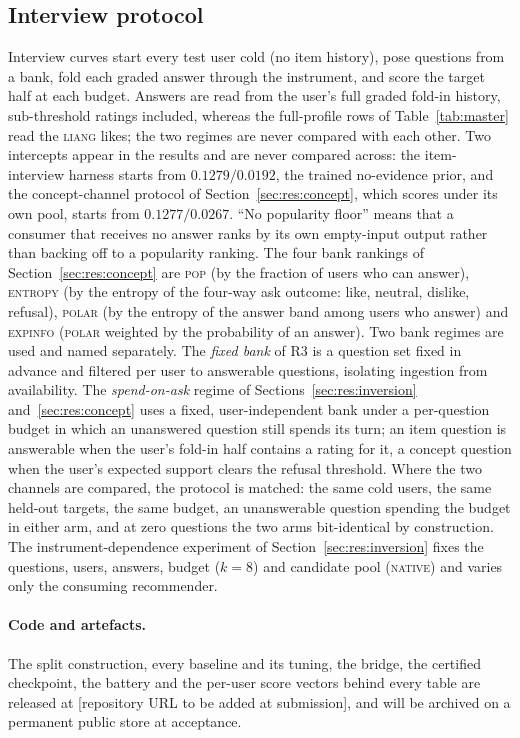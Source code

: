 \documentclass[manuscript,screen,review]{acmart}
\begin{document}
\subsection{Interview protocol}
Interview curves start every test user cold (no item history), pose questions from a bank, fold each graded answer through the instrument, and score the target half at each budget. Answers are read from the user's full graded fold-in history, sub-threshold ratings included, whereas the full-profile rows of Table~\ref{tab:master} read the \textsc{liang} likes; the two regimes are never compared with each other. Two intercepts appear in the results and are never compared across: the item-interview harness starts from $0.1279/0.0192$, the trained no-evidence prior, and the concept-channel protocol of Section~\ref{sec:res:concept}, which scores under its own pool, starts from $0.1277/0.0267$. ``No popularity floor'' means that a consumer that receives no answer ranks by its own empty-input output rather than backing off to a popularity ranking. The four bank rankings of Section~\ref{sec:res:concept} are \textsc{pop} (by the fraction of users who can answer), \textsc{entropy} (by the entropy of the four-way ask outcome: like, neutral, dislike, refusal), \textsc{polar} (by the entropy of the answer band among users who answer) and \textsc{expinfo} (\textsc{polar} weighted by the probability of an answer). Two bank regimes are used and named separately. The \emph{fixed bank} of R3 is a question set fixed in advance and filtered per user to answerable questions, isolating ingestion from availability. The \emph{spend-on-ask} regime of Sections~\ref{sec:res:inversion} and~\ref{sec:res:concept} uses a fixed, user-independent bank under a per-question budget in which an unanswered question still spends its turn; an item question is answerable when the user's fold-in half contains a rating for it, a concept question when the user's expected support clears the refusal threshold. Where the two channels are compared, the protocol is matched: the same cold users, the same held-out targets, the same budget, an unanswerable question spending the budget in either arm, and at zero questions the two arms bit-identical by construction. The instrument-dependence experiment of Section~\ref{sec:res:inversion} fixes the questions, users, answers, budget ($k{=}8$) and candidate pool (\textsc{native}) and varies only the consuming recommender.

\paragraph{Code and artefacts.} The split construction, every baseline and its tuning, the bridge, the certified checkpoint, the battery and the per-user score vectors behind every table are released at [repository URL to be added at submission], and will be archived on a permanent public store at acceptance.
\end{document}
